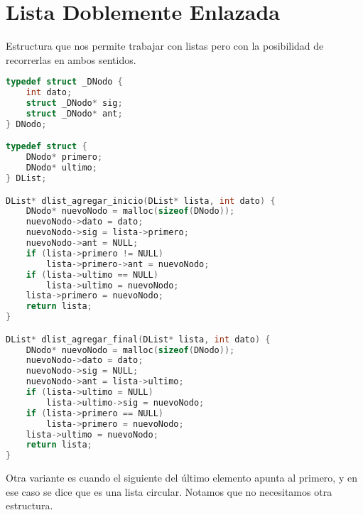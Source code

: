 \documentclass[11pt,a4paper]{article}
\begin{document}
\section{Lista Doblemente Enlazada}
Estructura que nos permite trabajar con listas pero con la posibilidad de recorrerlas en ambos sentidos.
\begin{lstlisting}[language=C]
typedef struct _DNodo {
	int dato;
	struct _DNodo* sig;
	struct _DNodo* ant;
} DNodo;

typedef struct {
	DNodo* primero;
	DNodo* ultimo;
} DList;

DList* dlist_agregar_inicio(DList* lista, int dato) {
	DNodo* nuevoNodo = malloc(sizeof(DNodo));
	nuevoNodo->dato = dato;
	nuevoNodo->sig = lista->primero;
	nuevoNodo->ant = NULL;
	if (lista->primero != NULL)
		lista->primero->ant = nuevoNodo;
	if (lista->ultimo == NULL)
		lista->ultimo = nuevoNodo;
	lista->primero = nuevoNodo;
	return lista;
}

DList* dlist_agregar_final(DList* lista, int dato) {
	DNodo* nuevoNodo = malloc(sizeof(DNodo));
	nuevoNodo->dato = dato;
	nuevoNodo->sig = NULL;
	nuevoNodo->ant = lista->ultimo;
	if (lista->ultimo = NULL)
		lista->ultimo->sig = nuevoNodo;
	if (lista->primero == NULL)
		lista->primero = nuevoNodo;
	lista->ultimo = nuevoNodo;
	return lista;
}
\end{lstlisting}

Otra variante es cuando el siguiente del \'ultimo elemento apunta al primero, y en ese caso se dice que es una lista circular. Notamos que no necesitamos otra estructura.
\end{document}
